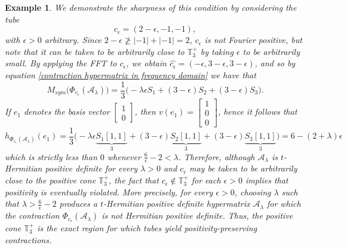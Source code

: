\documentclass[11pt]{article}
\newtheorem{example}[theorem]{Example}
\begin{document}
\begin{example}
    We demonstrate the sharpness of this condition by considering the tube 
    \[c_{\epsilon} = (2-\epsilon,-1,-1),\]
    with $\epsilon > 0$ arbitrary. Since $2-\epsilon \ngeq |-1|+|-1| = 2$, $c_{\epsilon}$ is not Fourier positive, but note that it can be taken to be arbitrarily close to $\mathbb{T}_3^+$ by taking $\epsilon$ to be arbitrarily small. By applying the FFT to $c_{\epsilon}$, we obtain $\widehat{c_{\epsilon}} = (-\epsilon,3-\epsilon,3-\epsilon)$, and so by equation \eqref{contraction hypermatrix in frequency domain} we have that 
    \[M_{sym}\big(\Phi_{c_{\epsilon}}(\mathcal{A}_{\lambda})\big) = \frac{1}{3}\big(-\lambda\epsilon S_1 + (3-\epsilon)S_2 + (3-\epsilon)S_3\big).\]
    If $e_1$ denotes the basis vector $\left[\begin{array}{c}
        1 \\
        0 
    \end{array}\right]$, then $v(e_1) = \left[\begin{array}{c}
        1 \\
        0 \\
        0
    \end{array}\right]$, hence it follows that 
    \[h_{\Phi_{c_{\epsilon}}(\mathcal{A}_{\lambda})}(e_1) = \frac{1}{3}\big(-\lambda\epsilon\underbrace{S_1[1,1]}_{3} + (3-\epsilon)\underbrace{S_2[1,1]}_{3} + (3-\epsilon)\underbrace{S_3[1,1]}_{3}\big) = 6 - (2+\lambda)\epsilon\]
    which is strictly less than $0$ whenever $\frac{6}{\epsilon}-2 < \lambda$. Therefore, although $\mathcal{A}_{\lambda}$ is $t$-Hermitian positive definite for every $\lambda > 0$ and $c_{\epsilon}$ may be taken to be arbitrarily close to the positive cone $\mathbb{T}_3^+$, the fact that $c_{\epsilon}\notin \mathbb{T}_3^+$ for each $\epsilon > 0$ implies that positivity is eventually violated. More precisely, for every $\epsilon > 0$, choosing $\lambda$ such that $\lambda > \frac{6}{\epsilon}-2$ produces a $t$-Hermitian positive definite hypermatrix $\mathcal{A}_{\lambda}$ for which the contraction $\Phi_{c_{\epsilon}}(\mathcal{A}_{\lambda})$ is not Hermitian positive definite. Thus, the positive cone $\mathbb{T}_3^+$ is the exact region for which tubes yield positivity-preserving contractions.  


\end{example}
\end{document}
